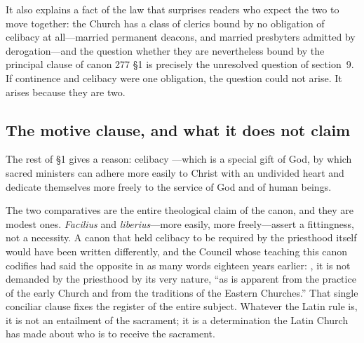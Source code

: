 It also explains a fact of the law that surprises readers who expect the two to move together: the Church has a class of clerics bound by no obligation of celibacy at all---married permanent deacons, and married presbyters admitted by derogation---and the question whether they are nevertheless bound by the principal clause of canon 277 §1 is precisely the unresolved question of section~9. If continence and celibacy were one obligation, the question could not arise. It arises because they are two.

\subsection{The motive clause, and what it does not claim}

The rest of §1 gives a reason: celibacy ---which is a special gift of God, by which sacred ministers can adhere more easily to Christ with an undivided heart and dedicate themselves more freely to the service of God and of human beings.

The two comparatives are the entire theological claim of the canon, and they are modest ones. \emph{Facilius} and \emph{liberius}---more easily, more freely---assert a fittingness, not a necessity. A canon that held celibacy to be required by the priesthood itself would have been written differently, and the Council whose teaching this canon codifies had said the opposite in as many words eighteen years earlier: , it is not demanded by the priesthood by its very nature, ``as is apparent from the practice of the early Church and from the traditions of the Eastern Churches.'' That single conciliar clause fixes the register of the entire subject. Whatever the Latin rule is, it is not an entailment of the sacrament; it is a determination the Latin Church has made about who is to receive the sacrament.

